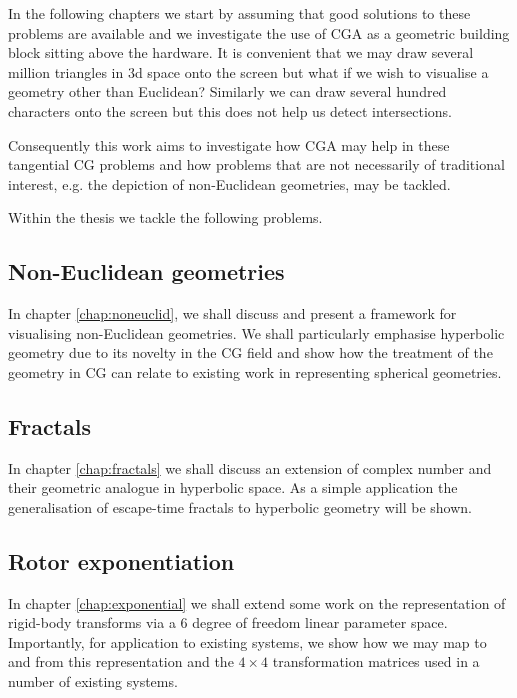 In the following chapters we start by assuming that good solutions to these problems are
available and we investigate the use of CGA as a geometric building block sitting above
the hardware. It is convenient that we may draw several million triangles in 3d space onto
the screen but what if we wish to visualise a geometry other than Euclidean? Similarly
we can draw several hundred characters onto the screen but this does not help us detect
intersections.

Consequently this work aims to investigate how CGA may help in these tangential CG problems
and how problems that are not necessarily of traditional interest, e.g. the depiction of
non-Euclidean geometries, may be tackled.

Within the thesis we tackle the following problems.

\subsection{Non-Euclidean geometries}

In chapter \ref{chap:noneuclid}, we shall discuss and present a framework for
visualising non-Euclidean geometries. We shall particularly emphasise hyperbolic
geometry due to its novelty in the CG field and show how the treatment of the
geometry in CG can relate to existing work\cite{bodo-sommer} in representing
spherical geometries.

\subsection{Fractals}

In chapter \ref{chap:fractals} we shall discuss an extension of complex number and
their geometric analogue in hyperbolic space. As a simple application the generalisation
of escape-time fractals to hyperbolic geometry will be shown.

\subsection{Rotor exponentiation}

In chapter \ref{chap:exponential} we shall extend some work\cite{bodo-thesis} on
the representation of rigid-body transforms via a 6 degree of freedom linear
parameter space. Importantly, for application to existing systems, we show how
we may map to and from this representation and the $4 \times 4$ transformation matrices
used in a number of existing systems.

